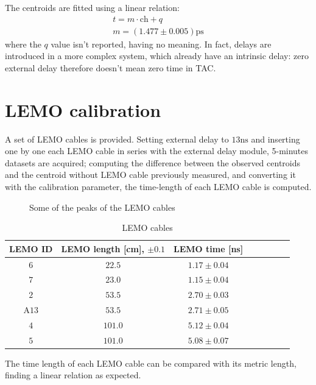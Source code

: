 \documentclass[11pt,a4 paper]{article}
\begin{document}
The centroids are fitted using a linear relation:
\begin{gather*}
    t = m\cdot \text{ch} + q \\
    m = (1.477 \pm 0.005) \si{\pico\second}
\end{gather*}
where the $q$ value isn't reported, having no meaning. In fact, delays are introduced in a more complex system, which already have an intrinsic delay: zero external delay therefore doesn't mean zero time in TAC.

\section{LEMO calibration}
A set of LEMO cables is provided. Setting external delay to $13\si{\nano\second}$ and inserting one by one each LEMO cable in series with the external delay module, 5-minutes datasets are acquired; computing the difference between the observed centroids and the centroid without LEMO cable previously measured, and converting it with the calibration parameter, the time-length of each LEMO cable is computed.

\begin{figure}[H]
    \centering
    \caption{Some of the peaks of the LEMO cables}
    \label{fig:lemo}
\end{figure}

\begin{table}[H]
    \centering
    \begin{tabular}{cccccccc}
        \toprule
        LEMO ID & LEMO length [cm], $\pm 0.1$ & LEMO time [ns]\\
        \midrule
        $6$ & $22.5$ & $1.17\pm0.04$\\
        $7$ & $23.0$ & $1.15\pm0.04$\\
        $2$ & $53.5$ & $2.70\pm0.03$\\
        A$13$ & $53.5$ & $2.71\pm0.05$\\
        $4$ & $101.0$ & $5.12\pm0.04$\\
        $5$ & $101.0$ & $5.08\pm0.07$\\
        \bottomrule
    \end{tabular}
    \caption{LEMO cables}
    \label{tab:lemo}
\end{table}

The time length of each LEMO cable can be compared with its metric length, finding a linear relation as expected.
\end{document}
